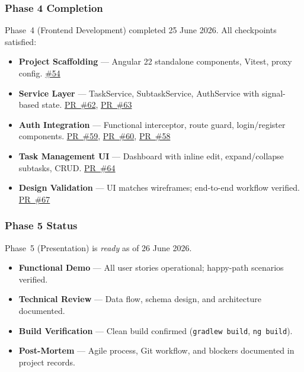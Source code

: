 \subsubsection{Phase 4 Completion}
Phase~4 (Frontend Development) completed 25 June 2026. All checkpoints satisfied:
\begin{itemize}
  \item \textbf{Project Scaffolding} --- Angular 22 standalone components, Vitest, proxy config.
    \href{https://github.com/JaehoonSong12/PEP-Team02-TheDJs/issues/54}{\#54}
  \item \textbf{Service Layer} --- TaskService, SubtaskService, AuthService with signal-based state.
    \href{https://github.com/JaehoonSong12/PEP-Team02-TheDJs/pull/62}{PR~\#62},
    \href{https://github.com/JaehoonSong12/PEP-Team02-TheDJs/pull/63}{PR~\#63}
  \item \textbf{Auth Integration} --- Functional interceptor, route guard, login/register components.
    \href{https://github.com/JaehoonSong12/PEP-Team02-TheDJs/pull/59}{PR~\#59},
    \href{https://github.com/JaehoonSong12/PEP-Team02-TheDJs/pull/60}{PR~\#60},
    \href{https://github.com/JaehoonSong12/PEP-Team02-TheDJs/pull/58}{PR~\#58}
  \item \textbf{Task Management UI} --- Dashboard with inline edit, expand/collapse subtasks, CRUD.
    \href{https://github.com/JaehoonSong12/PEP-Team02-TheDJs/pull/64}{PR~\#64}
  \item \textbf{Design Validation} --- UI matches wireframes; end-to-end workflow verified.
    \href{https://github.com/JaehoonSong12/PEP-Team02-TheDJs/pull/67}{PR~\#67}
\end{itemize}

\subsubsection{Phase 5 Status}
Phase~5 (Presentation) is \emph{ready} as of 26 June 2026.
\begin{itemize}
  \item \textbf{Functional Demo} --- All user stories operational; happy-path scenarios verified.
  \item \textbf{Technical Review} --- Data flow, schema design, and architecture documented.
  \item \textbf{Build Verification} --- Clean build confirmed (\texttt{gradlew build}, \texttt{ng build}).
  \item \textbf{Post-Mortem} --- Agile process, Git workflow, and blockers documented in project records.
\end{itemize}

\newpage
